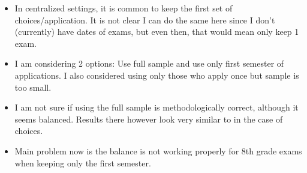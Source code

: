 \begin{itemize}
    \item In centralized settings, it is common to keep the first set of choices/application. It is not clear I can do the same here since I don't (currently) have dates of exams, but even then, that would mean only keep 1 exam.
    \item I am considering 2 options: Use full sample and use only first semester of applications. I also considered using only those who apply once but sample is too small.
    \item I am not sure if using the full sample is methodologically correct, although it seems balanced. Results there however look very similar to \cite{altmejd_o_2021} in the case of choices.
    \item Main problem now is the balance is not working properly for 8th grade exams when keeping only the first semester.
\end{itemize}

